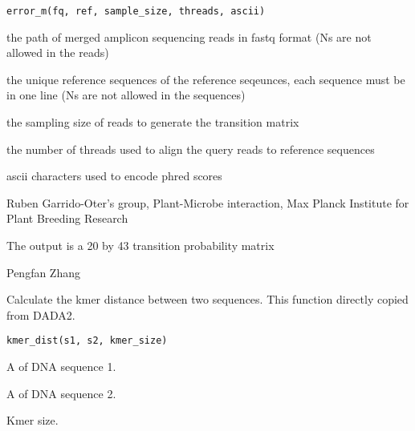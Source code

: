 \documentclass[a4paper]{book}
\begin{document}
%
\begin{Usage}
\begin{verbatim}
error_m(fq, ref, sample_size, threads, ascii)
\end{verbatim}
\end{Usage}
%
\begin{Arguments}
\begin{ldescription}
\item[\code{fq}] the path of merged amplicon sequencing reads in fastq format (Ns are not allowed in the reads)

\item[\code{ref}] the unique reference sequences of the reference seqeunces, each sequence must be in one line (Ns are not allowed in the sequences)

\item[\code{sample\_size}] the sampling size of reads to generate the transition matrix

\item[\code{threads}] the number of threads used to align the query reads to reference sequences

\item[\code{ascii}] ascii characters used to encode phred scores
\end{ldescription}
\end{Arguments}
%
\begin{Details}\relax
Ruben Garrido-Oter's group, Plant-Microbe interaction, Max Planck Institute for Plant Breeding Research
\end{Details}
%
\begin{Value}
The output is a 20 by 43 transition probability matrix
\end{Value}
%
\begin{Author}\relax
Pengfan Zhang
\end{Author}
%
\begin{Description}\relax
Calculate the kmer distance between two sequences. This function directly copied from DADA2.
\end{Description}
%
\begin{Usage}
\begin{verbatim}
kmer_dist(s1, s2, kmer_size)
\end{verbatim}
\end{Usage}
%
\begin{Arguments}
\begin{ldescription}
\item[\code{s1}] A  of DNA sequence 1.

\item[\code{s2}] A  of DNA sequence 2.

\item[\code{kmer\_size}] Kmer size.
\end{ldescription}
\end{Arguments}
\end{document}
